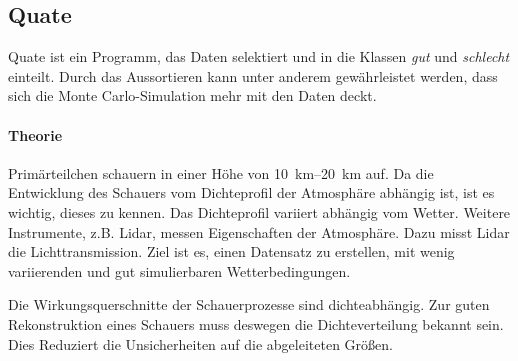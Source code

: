 \subsection{Quate}%
\label{sub:quate}

Quate ist ein Programm,
das
Daten selektiert und in die Klassen \textit{gut} und \textit{schlecht} einteilt.
Durch das Aussortieren kann unter anderem gewährleistet werden,
dass sich die Monte Carlo-Simulation mehr mit den Daten deckt.

\paragraph{Theorie}%
Primärteilchen schauern in einer Höhe von \SIrange{10}{20}{\kilo\meter}
auf.
Da die Entwicklung des Schauers vom Dichteprofil der Atmosphäre abhängig ist,
ist es wichtig, dieses zu kennen.
Das Dichteprofil variiert abhängig vom Wetter.
Weitere Instrumente, z.B. Lidar, messen Eigenschaften der Atmosphäre.
Dazu misst Lidar die Lichttransmission.
Ziel ist es, einen Datensatz zu erstellen,
mit wenig variierenden und gut simulierbaren Wetterbedingungen.

Die Wirkungsquerschnitte der Schauerprozesse sind dichteabhängig.
Zur guten Rekonstruktion eines Schauers muss deswegen die Dichteverteilung
bekannt sein.
Dies Reduziert die Unsicherheiten auf die abgeleiteten Größen.



